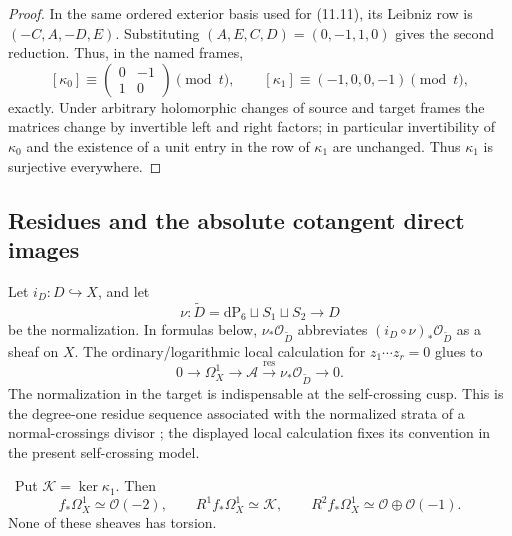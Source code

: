 \begin{proof}
In the same ordered exterior basis used for (11.11), its Leibniz row is
\((-C,A,-D,E)\).  Substituting
\((A,E,C,D)=(0,-1,1,0)\) gives the second reduction.  Thus, in the named
frames,
\[
 [\kappa_0]\equiv\begin{pmatrix}0&-1\\1&0\end{pmatrix}\pmod t,
 \qquad [\kappa_1]\equiv(-1,0,0,-1)\pmod t,
\]
exactly.  Under arbitrary holomorphic changes of source and target frames
the matrices change by invertible left and right factors; in particular
invertibility of \(\kappa_0\) and the existence of a unit entry in the row
of \(\kappa_1\) are unchanged.  Thus $\kappa_1$ is surjective everywhere.
\end{proof}

\subsection{Residues and the absolute cotangent direct images}

Let $i_D:D\hookrightarrow X$, and let
\[
 \nu:\widetilde D=\mathrm{dP}_6\sqcup S_1\sqcup S_2\longrightarrow D
\]
be the normalization.  In formulas below, $\nu_*\mathcal O_{\widetilde D}$
abbreviates $(i_D\circ\nu)_*\mathcal O_{\widetilde D}$ as a sheaf on $X$.
The ordinary/logarithmic local calculation for
$z_1\cdots z_r=0$ glues to
\[
 0\longrightarrow\Omega_X^1\longrightarrow\mathcal A
 \xrightarrow{\operatorname{res}}\nu_*\mathcal O_{\widetilde D}
 \longrightarrow0.
\tag{11.12}
\]
The normalization in the target is indispensable at the self-crossing
cusp.  This is the degree-one residue sequence associated with the normalized
strata of a normal-crossings divisor
\cite[Chapter~II, \S3.4--3.7, pp.~76--78]{Deligne1970}; the displayed local
calculation fixes its convention in the present self-crossing model.

\begin{proposition}
\label{prop:absolute-cotangent-direct-images}
\Verified\ Put $\mathcal K=\ker\kappa_1$.  Then
\[
 f_*\Omega_X^1\simeq\mathcal O(-2),\qquad
 R^1f_*\Omega_X^1\simeq\mathcal K,\qquad
 R^2f_*\Omega_X^1\simeq\mathcal O\oplus\mathcal O(-1).
\tag{11.13}
\]
None of these sheaves has torsion.
\end{proposition}

